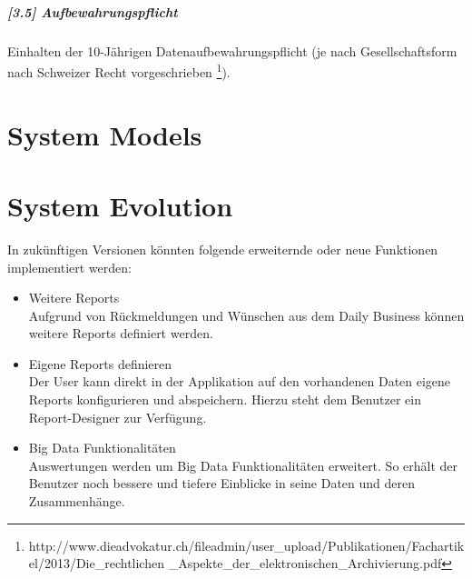 \documentclass[a4paper]{scrreprt}
\begin{document}
\paragraph{[3.5] Aufbewahrungspflicht} Einhalten der 10-Jährigen Datenaufbewahrungspflicht (je nach Gesellschaftsform nach Schweizer Recht vorgeschrieben \footnote{http://www.dieadvokatur.ch/fileadmin/user\_upload/Publikationen/Fachartikel/2013/Die\_rechtlichen \_Aspekte\_der\_elektronischen\_Archivierung.pdf}).




\chapter{System Models}



\chapter{System Evolution}

In zukünftigen Versionen könnten folgende erweiternde oder neue Funktionen implementiert werden:
\begin{itemize}
\item Weitere Reports\\
Aufgrund von Rückmeldungen und Wünschen aus dem Daily Business können weitere Reports definiert werden.
\item Eigene Reports definieren\\
Der User kann direkt in der Applikation auf den vorhandenen Daten eigene Reports konfigurieren und abspeichern. Hierzu steht dem Benutzer ein Report-Designer zur Verfügung.
\item Big Data Funktionalitäten \\
Auswertungen werden um Big Data Funktionalitäten erweitert. So erhält der Benutzer noch bessere und tiefere Einblicke in seine Daten und deren Zusammenhänge.
\end{itemize}
\end{document}
